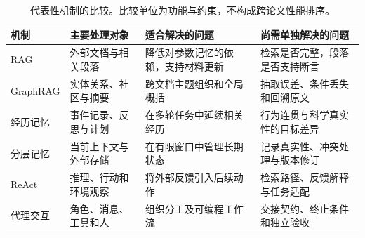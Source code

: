 \begin{table}[t]
\centering\tabletext
\caption{代表性机制的比较。比较单位为功能与约束，不构成跨论文性能排序。}
\label{tab:mechanisms}
\renewcommand{\arraystretch}{1.18}
\begin{tabularx}{\textwidth}{@{}>{\raggedright\arraybackslash}p{24mm}>{\raggedright\arraybackslash}p{34mm}YY@{}}\toprule
机制 & 主要处理对象 & 适合解决的问题 & 尚需单独解决的问题\\\midrule
RAG\cite{rag} & 外部文档与相关段落 & 降低对参数记忆的依赖，支持材料更新 & 检索是否完整，段落是否支持断言\\
GraphRAG\cite{graphrag} & 实体关系、社区与摘要 & 跨文档主题组织和全局概括 & 抽取误差、条件丢失和回溯原文\\
经历记忆\cite{generative} & 事件记录、反思与计划 & 在多轮任务中延续相关经历 & 行为连贯与科学真实性的目标差异\\
分层记忆\cite{memgpt} & 当前上下文与外部存储 & 在有限窗口中管理长期状态 & 记录真实性、冲突处理与版本修订\\
ReAct\cite{react} & 推理、行动和环境观察 & 将外部反馈引入后续动作 & 检索路径、反馈解释与任务适配\\
代理交互\cite{autogen} & 角色、消息、工具和人 & 组织分工及可编程工作流 & 交接契约、终止条件和独立验收\\\bottomrule
\end{tabularx}
\end{table}
